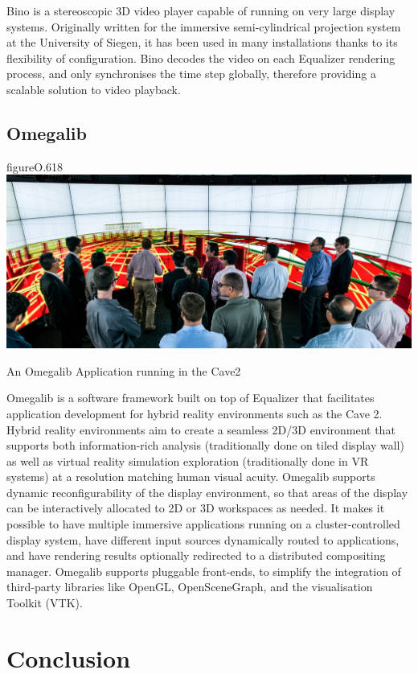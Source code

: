 Bino is a stereoscopic 3D video player capable of running on very large display
systems. Originally written for the immersive semi-cylindrical projection
system at the University of Siegen, it has been used in many installations
thanks to its flexibility of configuration. Bino decodes the video on each
Equalizer rendering process, and only synchronises the time step globally,
therefore providing a scalable solution to video playback.

\section{Omegalib}

\begin{wrapfloat}{figure}{O}{.618\textwidth}
  \includegraphics[width=.618\textwidth]{images/omegalib}
  {\caption{\label{fOmegalib}An Omegalib Application running in the Cave2}}
\end{wrapfloat}

Omegalib \cite{Omegalib} is a software framework built on top of Equalizer that
facilitates application development for hybrid reality environments such as the
Cave 2. Hybrid reality environments aim to create a seamless 2D/3D environment
that supports both information-rich analysis (traditionally done on tiled
display wall) as well as virtual reality simulation exploration (traditionally
done in VR systems) at a resolution matching human visual acuity. Omegalib
supports dynamic reconfigurability of the display environment, so that areas of
the display can be interactively allocated to 2D or 3D workspaces as needed. It
makes it possible to have multiple immersive applications running on a
cluster-controlled display system, have different input sources dynamically
routed to applications, and have rendering results optionally redirected to a
distributed compositing manager. Omegalib supports pluggable front-ends, to
simplify the integration of third-party libraries like OpenGL, OpenSceneGraph,
and the visualisation Toolkit (VTK).


\chapter{Conclusion}\label{sConclusion}

